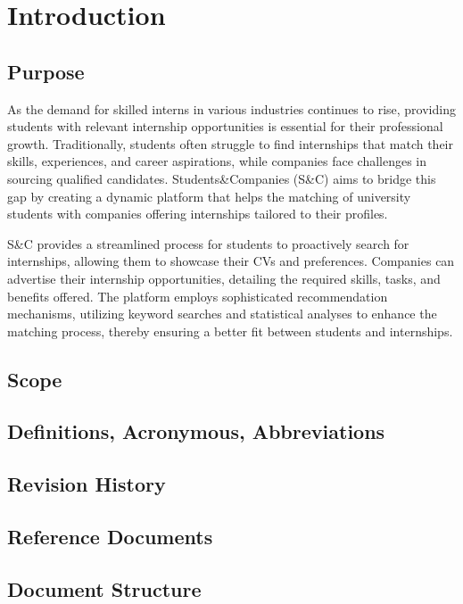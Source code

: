 \chapter{Introduction}

\section{Purpose}
As the demand for skilled interns in various industries continues to rise, providing students with relevant internship opportunities is essential for their professional growth. 
Traditionally, students often struggle to find internships that match their skills, experiences, and career aspirations, while companies face challenges in sourcing qualified candidates. 
Students\&Companies (S\&C) aims to bridge this gap by creating a dynamic platform that helps the matching of university students with companies offering internships tailored to their profiles.

S\&C provides a streamlined process for students to proactively search for internships, allowing them to showcase their CVs and preferences. 
Companies can advertise their internship opportunities, detailing the required skills, tasks, and benefits offered. The platform employs sophisticated recommendation mechanisms, utilizing keyword searches and statistical analyses to enhance the matching process, thereby ensuring a better fit between students and internships.

\section{Scope}
\section{Definitions, Acronymous, Abbreviations}
\section{Revision History}
\section{Reference Documents}
\section{Document Structure}